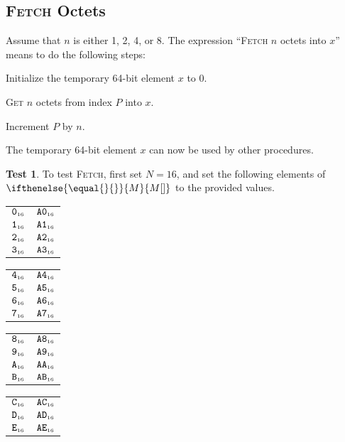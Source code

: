 \documentclass[a4paper,12pt]{article}
\makeatletter
\newcommand{\num}[1]{\texttt{#1}}
\newcommand{\hex}[1]{\num{#1}_{\textup{\tiny 16}}}
\newcommand{\MEM}[1]{\ifthenelse{\equal{#1}{}}{M}{M[#1]}}
\newcommand{\PC}{P}
\newcommand{\proc}[1]{\textsc{#1}}
\theoremstyle{definition}
\newtheorem{test}{Test}
\newenvironment{memtable}{%
  \begin{trivlist}
    \item
    }{%
    \end{trivlist}}
\newenvironment{memcolumn}{%
  \begin{tabular}{@{}ll@{}}
    \hline}
    {%
    \hline
  \end{tabular}}
\newcommand{\memspace}{\qquad}
\makeatother
\begin{document}
\subsection{\proc{Fetch} Octets}

Assume that $n$ is either 1, 2, 4, or 8.
The expression ``\proc{Fetch} $n$ octets into $x$'' means to do the following steps:
\begin{stepnumbers}
\item Initialize the temporary 64-bit element $x$ to 0.
\item \proc{Get} $n$ octets from index $\PC$ into $x$.
\item Increment $\PC$ by $n$.
\end{stepnumbers}
The temporary 64-bit element $x$ can now be used by other procedures.

\begin{test}
  To test \proc{Fetch}, first set $N=16$, and set the following elements of $\MEM{}$ to the provided values.
  \begin{memtable}
    \begin{memcolumn}
      $\hex{0}$ & $\hex{A0}$ \\
      $\hex{1}$ & $\hex{A1}$ \\
      $\hex{2}$ & $\hex{A2}$ \\
      $\hex{3}$ & $\hex{A3}$ \\
    \end{memcolumn}
    \memspace
    \begin{memcolumn}
      $\hex{4}$ & $\hex{A4}$ \\
      $\hex{5}$ & $\hex{A5}$ \\
      $\hex{6}$ & $\hex{A6}$ \\
      $\hex{7}$ & $\hex{A7}$ \\
    \end{memcolumn}
    \memspace
    \begin{memcolumn}
      $\hex{8}$ & $\hex{A8}$ \\
      $\hex{9}$ & $\hex{A9}$ \\
      $\hex{A}$ & $\hex{AA}$ \\
      $\hex{B}$ & $\hex{AB}$ \\
    \end{memcolumn}
    \memspace
    \begin{memcolumn}
      $\hex{C}$ & $\hex{AC}$ \\
      $\hex{D}$ & $\hex{AD}$ \\
      $\hex{E}$ & $\hex{AE}$ \\

\end{memcolumn}
\end{memtable}
\end{test}
\end{document}
